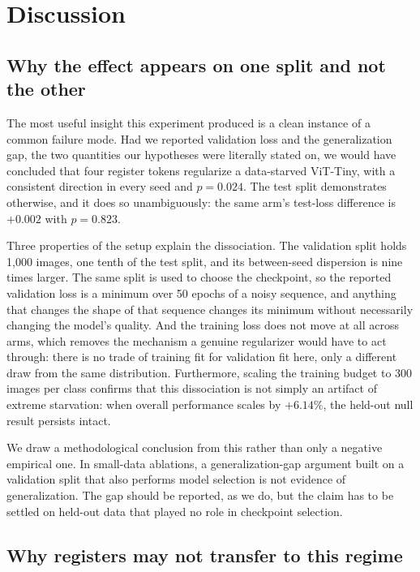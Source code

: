 \section{Discussion}
\label{sec:discussion}

\subsection{Why the effect appears on one split and not the other}

The most useful insight this experiment produced is a clean instance of a common
failure mode. Had we reported validation loss and the generalization gap, the
two quantities our hypotheses were literally stated on, we would have
concluded that four register tokens regularize a data-starved ViT-Tiny, with a
consistent direction in every seed and $p = 0.024$. The test split demonstrates
otherwise, and it does so unambiguously: the same arm's test-loss difference is
$+0.002$ with $p = 0.823$.

Three properties of the setup explain the dissociation. The validation split
holds 1{,}000 images, one tenth of the test split, and its between-seed
dispersion is nine times larger. The same split is used to choose the
checkpoint, so the reported validation loss is a minimum over 50 epochs of a
noisy sequence, and anything that changes the shape of that sequence changes its
minimum without necessarily changing the model's quality. And the training loss
does not move at all across arms, which removes the mechanism a genuine regularizer
would have to act through: there is no trade of training fit for validation fit
here, only a different draw from the same distribution. Furthermore, scaling the
training budget to 300 images per class confirms that this dissociation is not
simply an artifact of extreme starvation: when overall performance scales by
$+6.14\%$, the held-out null result persists intact.

We draw a methodological conclusion from this rather than only a negative
empirical one. In small-data ablations, a generalization-gap argument built on a
validation split that also performs model selection is not evidence of
generalization. The gap should be reported, as we do, but the claim has to be
settled on held-out data that played no role in checkpoint selection.

\subsection{Why registers may not transfer to this regime}

